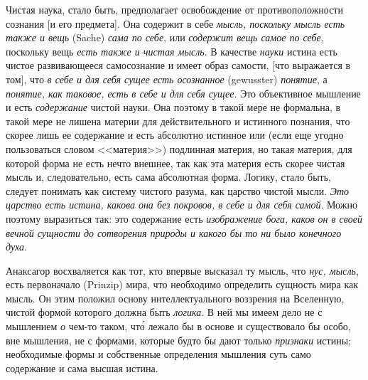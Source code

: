 Чистая наука, стало быть, предполагает освобождение
от противоположности сознания [и его предмета]. Она
содержит в себе \emph{мысль, поскольку мысль есть также и вещь}
(Sache) \emph{сама по себе}, или \emph{содержит вещь самое по себе},
поскольку вещь \emph{есть также и чистая мысль}. В качестве
\emph{науки} истина есть чистое развивающееся самосознание
и имеет образ самости, [что выражается в том], что \emph{в себе
и для себя сущее есть осознанное} (gewusster) \emph{понятие},
а \emph{понятие, как таковое, есть в себе и для себя сущее}.
Это объективное мышление и есть \emph{содержание} чистой
науки. Она поэтому в такой мере не формальна, в такой
мере не лишена материи для действительного и истинного
познания, что скорее лишь ее содержание и есть абсолютно
истинное или (если еще угодно пользоваться
словом <<материя>>) подлинная материя, но такая материя,
для которой форма не есть нечто внешнее, так как
эта материя есть скорее чистая мысль и, следовательно,
есть сама абсолютная форма. Логику, стало быть, следует
понимать как систему чистого разума, как царство
чистой мысли. \emph{Это царство есть истина, какова она без
покровов, в себе и для себя самой}. Можно поэтому выразиться
так: это содержание есть \emph{изображение бога, каков
он в своей вечной сущности до сотворения природы и
какого бы то ни было конечного духа}.

Анаксагор восхваляется как тот, кто впервые высказал
ту мысль, что \emph{нус, мысль}, есть первоначало (Prinzip)
мира, что необходимо определить сущность мира как
мысль. Он этим положил основу интеллектуального
воззрения на Вселенную, чистой формой которого должна
быть \emph{логика}. В ней мы имеем дело не с мышлением \emph{о}
чем-то таком, чт\'о лежало бы в основе и существовало
бы особо, вне мышления, не с формами, которые будто
бы дают только \emph{признаки} истины; необходимые формы
и собственные определения мышления суть само содержание
и сама высшая истина.

